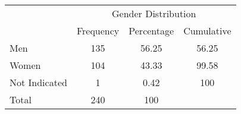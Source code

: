 {
\def\sym#1{\ifmmode^{#1}\else\(^{#1}\)\fi}
\begin{tabular}{l*{1}{ccc}}
\toprule
                   &\multicolumn{3}{c}{Gender Distribution}  \\
                   &      Frequency  &   Percentage &    Cumulative    \\
\midrule
Men               &      135 &         56.25 &       56.25     \\
\midrule
Women             &      104 &         43.33 &      99.58   \\
\midrule
Not Indicated     &      1   &         0.42  &      100  \\
\midrule
Total             &    240   &       100 &        \\
\bottomrule
\end{tabular}
}